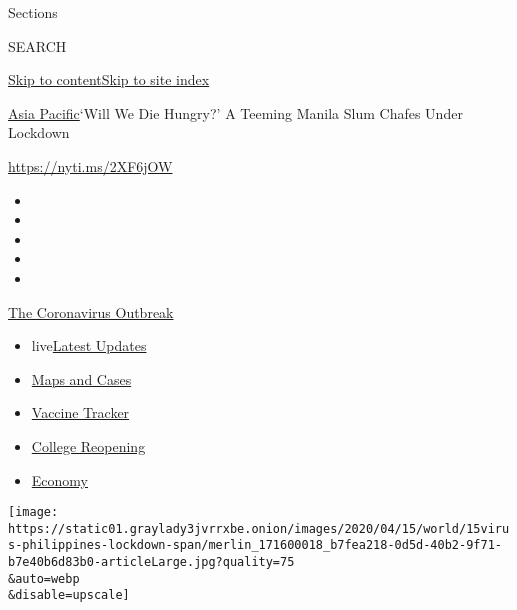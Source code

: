 Sections

SEARCH

\protect\hyperlink{site-content}{Skip to
content}\protect\hyperlink{site-index}{Skip to site index}

\href{/section/world/asia}{Asia Pacific}\textbar{}`Will We Die Hungry?'
A Teeming Manila Slum Chafes Under Lockdown

\url{https://nyti.ms/2XF6jOW}

\begin{itemize}
\item
\item
\item
\item
\item
\end{itemize}

\href{https://www.nytimes3xbfgragh.onion/news-event/coronavirus?action=click\&pgtype=Article\&state=default\&region=TOP_BANNER\&context=storylines_menu}{The
Coronavirus Outbreak}

\begin{itemize}
\tightlist
\item
  live\href{https://www.nytimes3xbfgragh.onion/2020/08/03/world/coronavirus-covid-19.html?action=click\&pgtype=Article\&state=default\&region=TOP_BANNER\&context=storylines_menu}{Latest
  Updates}
\item
  \href{https://www.nytimes3xbfgragh.onion/interactive/2020/us/coronavirus-us-cases.html?action=click\&pgtype=Article\&state=default\&region=TOP_BANNER\&context=storylines_menu}{Maps
  and Cases}
\item
  \href{https://www.nytimes3xbfgragh.onion/interactive/2020/science/coronavirus-vaccine-tracker.html?action=click\&pgtype=Article\&state=default\&region=TOP_BANNER\&context=storylines_menu}{Vaccine
  Tracker}
\item
  \href{https://www.nytimes3xbfgragh.onion/2020/08/02/us/covid-college-reopening.html?action=click\&pgtype=Article\&state=default\&region=TOP_BANNER\&context=storylines_menu}{College
  Reopening}
\item
  \href{https://www.nytimes3xbfgragh.onion/live/2020/08/03/business/stock-market-today-coronavirus?action=click\&pgtype=Article\&state=default\&region=TOP_BANNER\&context=storylines_menu}{Economy}
\end{itemize}

\texttt{[image: https://static01.graylady3jvrrxbe.onion/images/2020/04/15/world/15virus-philippines-lockdown-span/merlin\_171600018\_b7fea218-0d5d-40b2-9f71-b7e40b6d83b0-articleLarge.jpg?quality=75\\\&auto=webp\\\&disable=upscale]}

